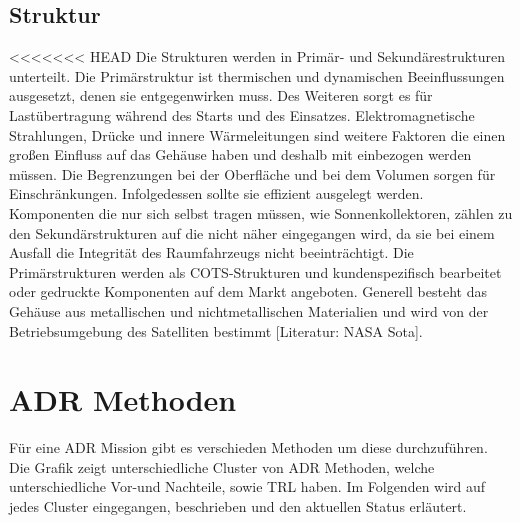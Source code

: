 		\subsection{Struktur}%
<<<<<<< HEAD
		Die Strukturen werden in Primär- und Sekundärestrukturen unterteilt. Die Primärstruktur ist thermischen und dynamischen Beeinflussungen ausgesetzt, denen sie entgegenwirken muss. Des Weiteren sorgt es für Lastübertragung während des Starts und des Einsatzes. Elektromagnetische Strahlungen, Drücke und innere Wärmeleitungen sind weitere Faktoren die einen großen Einfluss auf das Gehäuse haben und deshalb mit einbezogen werden müssen. Die Begrenzungen bei der Oberfläche und bei dem Volumen sorgen für Einschränkungen. Infolgedessen sollte sie effizient ausgelegt werden. Komponenten die nur sich selbst tragen müssen, wie Sonnenkollektoren, zählen zu den Sekundärstrukturen auf die nicht näher eingegangen wird, da sie bei einem Ausfall die Integrität des Raumfahrzeugs nicht beeinträchtigt. Die Primärstrukturen werden als COTS-Strukturen und kundenspezifisch bearbeitet oder gedruckte Komponenten auf dem Markt angeboten. Generell besteht das Gehäuse aus metallischen und nichtmetallischen Materialien und wird von der Betriebsumgebung des Satelliten bestimmt [Literatur: NASA Sota].

	\section{ADR Methoden}
Für eine ADR Mission gibt es verschieden Methoden um diese durchzuführen. Die Grafik zeigt unterschiedliche Cluster von ADR Methoden, welche unterschiedliche Vor-und Nachteile, sowie TRL haben. Im Folgenden wird auf jedes Cluster eingegangen, beschrieben und den aktuellen Status erläutert.
	
